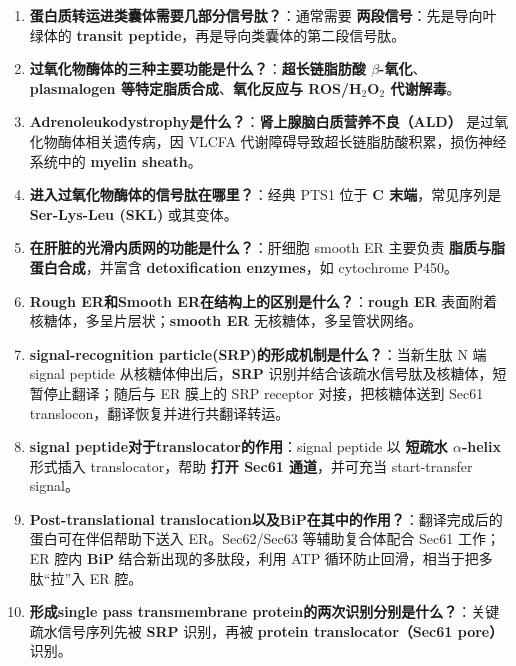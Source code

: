 \documentclass[12pt,fontset=none]{ctexart}
\begin{document}
\begin{enumerate}
\item \textbf{蛋白质转运进类囊体需要几部分信号肽？}：通常需要 \textbf{两段信号}：先是导向叶绿体的 \textbf{transit peptide}，再是导向类囊体的第二段信号肽。

\item \textbf{过氧化物酶体的三种主要功能是什么？}：\textbf{超长链脂肪酸 $\beta$-氧化}、\textbf{plasmalogen 等特定脂质合成}、\textbf{氧化反应与 ROS/H$_2$O$_2$ 代谢解毒}。

\item \textbf{Adrenoleukodystrophy是什么？}：\textbf{肾上腺脑白质营养不良（ALD）} 是过氧化物酶体相关遗传病，因 VLCFA 代谢障碍导致超长链脂肪酸积累，损伤神经系统中的 \textbf{myelin sheath}。

\item \textbf{进入过氧化物酶体的信号肽在哪里？}：经典 PTS1 位于 \textbf{C 末端}，常见序列是 \textbf{Ser-Lys-Leu (SKL)} 或其变体。

\item \textbf{在肝脏的光滑内质网的功能是什么？}：肝细胞 smooth ER 主要负责 \textbf{脂质与脂蛋白合成}，并富含 \textbf{detoxification enzymes}，如 cytochrome P450。

\item \textbf{Rough ER和Smooth ER在结构上的区别是什么？}：\textbf{rough ER} 表面附着核糖体，多呈片层状；\textbf{smooth ER} 无核糖体，多呈管状网络。

\item \textbf{signal-recognition particle(SRP)的形成机制是什么？}：当新生肽 N 端 signal peptide 从核糖体伸出后，\textbf{SRP} 识别并结合该疏水信号肽及核糖体，短暂停止翻译；随后与 ER 膜上的 SRP receptor 对接，把核糖体送到 Sec61 translocon，翻译恢复并进行共翻译转运。

\item \textbf{signal peptide对于translocator的作用}：signal peptide 以 \textbf{短疏水 $\alpha$-helix} 形式插入 translocator，帮助 \textbf{打开 Sec61 通道}，并可充当 start-transfer signal。

\item \textbf{Post-translational translocation以及BiP在其中的作用？}：翻译完成后的蛋白可在伴侣帮助下送入 ER。Sec62/Sec63 等辅助复合体配合 Sec61 工作；ER 腔内 \textbf{BiP} 结合新出现的多肽段，利用 ATP 循环防止回滑，相当于把多肽“拉”入 ER 腔。

\item \textbf{形成single pass transmembrane protein的两次识别分别是什么？}：关键疏水信号序列先被 \textbf{SRP} 识别，再被 \textbf{protein translocator（Sec61 pore）} 识别。


\end{enumerate}
\end{document}
